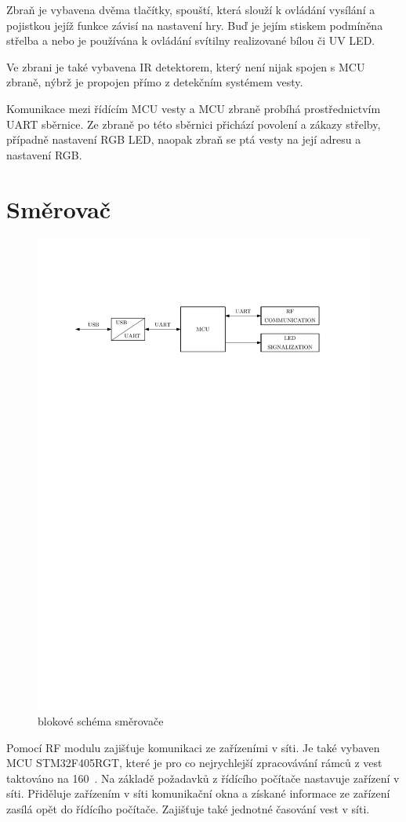 Zbraň je vybavena dvěma tlačítky, spouští, která slouží k ovládání vysílání a pojistkou jejíž funkce závisí na nastavení hry. Buď je jejím stiskem podmíněna střelba a nebo je používána k ovládání svítilny realizované bílou či UV LED.

Ve zbrani je také vybavena IR detektorem, který není nijak spojen s MCU zbraně, nýbrž je propojen přímo z detekčním systémem vesty.

Komunikace mezi řídícím MCU vesty a MCU zbraně probíhá prostřednictvím UART sběrnice. Ze zbraně po této sběrnici přichází povolení a zákazy střelby, případně nastavení RGB LED, naopak zbraň se ptá vesty na její adresu a nastavení RGB.

\section{Směrovač}
\begin{figure}[H]
    \begin{center}
        \includegraphics[width=\textwidth]{img/router}
    \end{center}
    \caption{blokové schéma směrovače}
\end{figure}
Pomocí RF modulu zajišťuje komunikaci ze zařízeními v síti. Je také vybaven MCU STM32F405RGT, které je pro co nejrychlejší zpracovávání rámců z vest taktováno na 160~. Na základě požadavků z řídícího počítače nastavuje zařízení v síti. Přiděluje zařízením v síti komunikační okna a získané informace ze zařízení zasílá opět do řídícího počítače. Zajišťuje také jednotné časování vest v síti.
